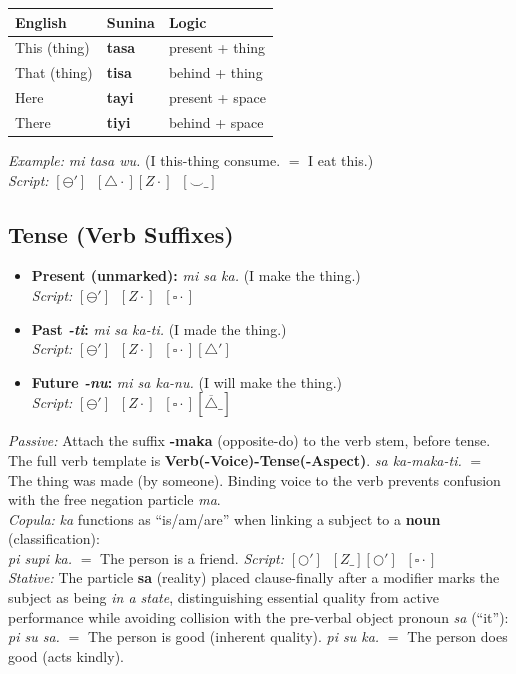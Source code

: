 \documentclass[12pt, a4paper]{article}
\begin{document}
\vspace{0.5em}
\begin{tabular}{@{}lll@{}}
\toprule
\textbf{English} & \textbf{Sunina} & \textbf{Logic} \\ \midrule
This (thing) & \textbf{tasa} & present + thing \\
That (thing) & \textbf{tisa} & behind + thing \\
Here & \textbf{tayi} & present + space \\
There & \textbf{tiyi} & behind + space \\
\bottomrule
\end{tabular}

\vspace{0.5em}
\noindent\textit{Example:} \textit{mi tasa wu.} \quad (I this-thing consume. $=$ I eat this.) \\
\textit{Script:} $[\ominus'] \;\; [\triangle\cdot][Z\cdot] \;\; [\smile\_]$

\subsection{Tense (Verb Suffixes)}
\begin{itemize}
    \item \textbf{Present (unmarked):} \textit{mi sa ka.} \quad (I make the thing.) \\
    \textit{Script:} $[\ominus'] \;\; [Z\cdot] \;\; [\square\cdot]$
    \item \textbf{Past \textit{-ti}:} \textit{mi sa ka-ti.} \quad (I made the thing.) \\
    \textit{Script:} $[\ominus'] \;\; [Z\cdot] \;\; [\square\cdot][\triangle']$
    \item \textbf{Future \textit{-nu}:} \textit{mi sa ka-nu.} \quad (I will make the thing.) \\
    \textit{Script:} $[\ominus'] \;\; [Z\cdot] \;\; [\square\cdot][\overline{\triangle}\_]$
\end{itemize}
\textit{Passive:} Attach the suffix \textbf{-maka} (opposite-do) to the verb stem, before tense. The full verb template is \textbf{Verb(-Voice)-Tense(-Aspect)}. \quad \textit{sa ka-maka-ti.} $=$ The thing was made (by someone). Binding voice to the verb prevents confusion with the free negation particle \textit{ma}. \\
\textit{Copula:} \textit{ka} functions as ``is/am/are'' when linking a subject to a \textbf{noun} (classification): \\
\textit{pi supi ka.} $=$ The person is a friend. \quad \textit{Script:} $[\bigcirc'] \;\; [Z\_][\bigcirc'] \;\; [\square\cdot]$ \\
\textit{Stative:} The particle \textbf{sa} (reality) placed clause-finally after a modifier marks the subject as being \textit{in a state}, distinguishing essential quality from active performance while avoiding collision with the pre-verbal object pronoun \textit{sa} (``it''): \\
\textit{pi su sa.} $=$ The person is good (inherent quality). \quad \textit{pi su ka.} $=$ The person does good (acts kindly).
\end{document}
